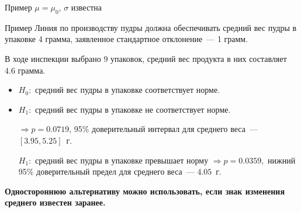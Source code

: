 \documentclass[11pt,pdf,utf8,hyperref={unicode},aspectratio=169]{beamer}
\begin{document}
\begin{frame}{\hyperlink{onesample}{} Пример  $\mu=\mu_0$, $\sigma$ известна }
    \begin{block}{Пример}
    Линия по производству пудры должна обеспечивать средний вес пудры в упаковке 4 грамма, заявленное стандартное отклонение~--- 1 грамм.

    В ходе инспекции выбрано 9 упаковок, средний вес продукта в них составляет 4.6 грамма.
    \end{block}
    \bigskip
    \begin{itemize}
    \item $H_0\colon$ средний вес пудры в упаковке соответствует норме.

    \item $H_1\colon$ средний вес пудры в упаковке не соответствует норме.

     $\Rightarrow p = 0.0719$, 95\% доверительный интервал для среднего веса~--- $\left[3.95, 5.25\right]$~г.

    $H_1\colon$ средний вес пудры в упаковке превышает норму  $\Rightarrow p = 0.0359,$ нижний 95\% доверительный предел для среднего веса~--- $4.05$~г.
    \end{itemize}
\textbf{Одностороннюю альтернативу можно использовать, если знак изменения среднего известен заранее.}

\end{frame}
\end{document}
